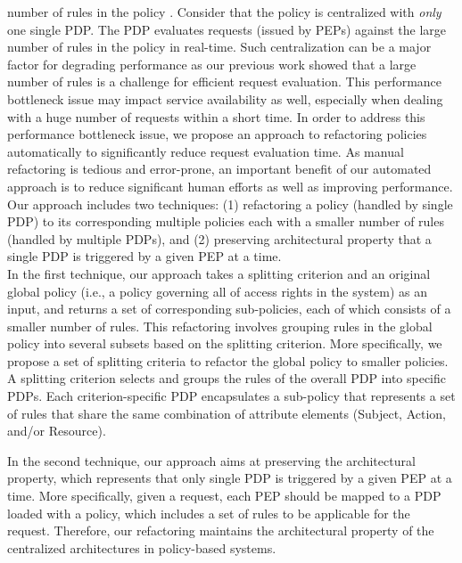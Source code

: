 number of rules in the policy \cite{policymanagement}.
Consider that the policy is centralized with \emph{only} one single PDP.
The PDP evaluates requests (issued by PEPs) against
the large number of rules in the policy in real-time.
Such centralization can be a major factor for degrading performance as our previous work \cite{Xengine} showed that a large number of rules is a challenge for efficient request evaluation.
This performance bottleneck issue may impact service
availability as well, especially when dealing with a huge number of requests within a short time.
In order to address this performance bottleneck issue,
we propose an approach to refactoring policies automatically to significantly reduce
request evaluation time.
As manual refactoring is tedious and error-prone, an important benefit of our automated approach is to reduce significant human efforts as well as
improving performance.
Our approach includes two techniques: (1) refactoring a policy (handled by single PDP) to its corresponding multiple policies each with a smaller number of rules (handled by multiple PDPs),
and (2) preserving architectural property that a single PDP is triggered by a given PEP at a time.\\

In the first technique, our approach takes a splitting criterion and an original global policy (i.e., a policy governing all of access rights in the system) as an input, and returns a set of
corresponding sub-policies, each of which consists of a smaller number of rules.
This refactoring involves grouping rules in the global policy into several subsets based on the splitting criterion.
More specifically, we propose a set of splitting criteria to 
refactor the global policy to smaller policies.
A splitting criterion selects and groups the rules of the overall PDP into specific PDPs.
Each criterion-specific PDP encapsulates a sub-policy that represents a set of rules that share the same combination
of attribute elements (Subject, Action, and/or Resource).

In the second technique, our approach aims at preserving the architectural property, which represents that only single PDP is triggered by a given PEP at a time. 
More specifically, given a request, each PEP should be mapped to a PDP loaded with a policy, 
which includes a set of rules to be applicable for the request.
Therefore, our refactoring maintains the architectural property of the centralized architectures in policy-based systems.



